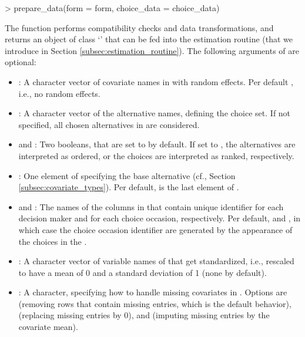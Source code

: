\documentclass[article,shortnames]{jss}
\newcommand{\class}[1]{`\code{#1}'}
\newcommand{\fct}[1]{\code{#1()}}
\begin{document}
\begin{Schunk}
\begin{Sinput}
> prepare_data(form = form, choice_data = choice_data)
\end{Sinput}
\end{Schunk}

The function performs compatibility checks and data transformations, and returns an object of class \class{RprobitB\_data} that can be fed into the estimation routine \fct{fit\_model} (that we introduce in Section \ref{subsec:estimation_routine}). The following arguments of \fct{prepare\_data} are optional:
\begin{itemize}
  \item {}: A character vector of covariate names in  with random effects. Per default , i.e., no random effects.
  \item {}: A character vector of the alternative names, defining the choice set. If not specified, all chosen alternatives in  are considered.
  \item {} and : Two booleans, that are set to  by default. If set to , the alternatives are interpreted as ordered, or the choices are interpreted as ranked, respectively.
  \item {}: One element of  specifying the base alternative (cf., Section \ref{subsec:covariate_types}). Per default,  is the last element of .
  \item {} and : The names of the columns in  that contain unique identifier for each decision maker and for each choice occasion, respectively. Per default,  and , in which case the choice occasion identifier are generated by the appearance of the choices in the .
  \item {}: A character vector of variable names of  that get standardized, i.e., rescaled to have a mean of 0 and a standard deviation of 1 (none by default).
  \item {}: A character, specifying how to handle missing covariates in . Options are  (removing rows that contain missing entries, which is the default behavior),  (replacing missing entries by 0), and  (imputing missing entries by the covariate mean).
\end{itemize}
\end{document}
